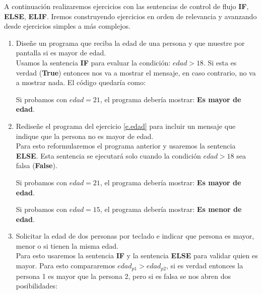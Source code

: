 A continuación realizaremos ejercicios con las sentencias de control de flujo \textbf{IF}, \textbf{ELSE}, \textbf{ELIF}. Iremos construyendo ejercicios en orden de relevancia y avanzando desde ejercicios simples a más complejos.

\begin{enumerate}[{Ejercicio} 1.]
    \item Diseñe un programa que reciba la edad de una persona y que muestre por pantalla si es mayor de edad.\label{e.edad}\\
    
    \asw Usamos la sentencia \textbf{IF} para evaluar la condición: \( edad > 18 \). Si esta es verdad (\textbf{True}) entonces nos va a mostrar el mensaje, en caso contrario, no va a mostrar nada. El código quedaría como:\\

    \begin{listing}[H]
    \end{listing}

    Si probamos con \(edad = 21\), el programa debería mostrar: \textbf{Es mayor de edad}.

    \item Rediseñe el programa del ejercicio \ref{e.edad} para incluir un mensaje que indique que la persona no es mayor de edad.\\
    
    \asw Para esto reformularemos el programa anterior y usaremos la sentencia \textbf{ELSE}. Esta sentencia se ejecutará solo cuando la condición \( edad > 18 \) sea falsa (\textbf{False}).\\

    \begin{listing}[H]
    \end{listing}

    Si probamos con \(edad = 21\), el programa debería mostrar: \textbf{Es mayor de edad}.

    Si probamos con \(edad = 15\), el programa debería mostrar: \textbf{Es menor de edad}.

    \item Solicitar la edad de dos personas por teclado e indicar que persona es mayor, menor o si tienen la misma edad.\\
    
    \asw Para esto usaremos la sentencia \textbf{IF} y la sentencia \textbf{ELSE} para validar quien es mayor. Para esto compararemos \(edad_{p1} > edad_{p2} \), si es verdad entonces la persona 1 es mayor que la persona 2, pero si es falsa se nos abren dos posibilidades:\\


\end{enumerate}
